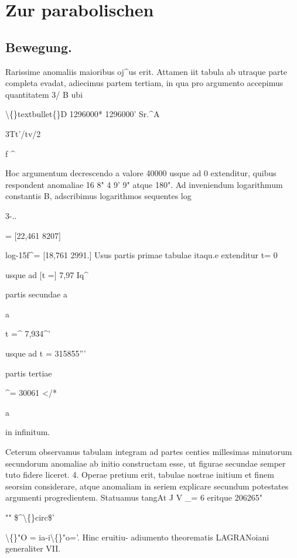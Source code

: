 \documentclass[10pt,a4paper]{article}
\begin{document}
\newpage
\section*{Zur parabolischen}

\subsection*{Bewegung.}


Rarissime anomaliis maioribus oj\textasciicircum{}us erit. Attamen iit tabula ab utraque
parte completa evadat, adiecimus partem tertiam, in qua pro argumento accepimus quantitatem
3/ B
ubi

\textbackslash\{\}textbullet\{\}D 1296000* 1296000'
Sr.\textasciicircum{}A

3Tt'/tv/2

f
\textasciicircum{}

Hoc argumentum decrescendo a valore 40000 usque ad 0 extenditur,
quibus respondent anomaliae 16 8" 4 9' 9" atque 180". Ad inveniendum logarithmum constantis B, adscribimus logarithmos sequentes
log

3-..

= [22,461 8207]

log-15f\textasciicircum{}= [18,761 2991.]
Usus partis primae tabulae itaqu.e extenditur
t= 0

usque ad [t =] 7,97 Iq\textasciicircum{}

partis secundae a

a

t =\textasciicircum{} 7,934\textasciicircum{}'

usque ad t = 315855'''

partis tertiae

\textasciicircum{}= 30061 </*

a

in infinitum.

Ceterum observamus tabulam integram ad partes centies millesimas minutorum secundorum anomaliae ab initio constructam esse, ut figurae secundae
semper tuto fidere liceret.
4.
Operae pretium erit, tabulae nostrae initium et finem seorsim considerare, atque anomaliam in seriem explicare secundum potestates argumenti progredientem.
Statuamus
tangAt J V \_= 6
eritque
206265"

"" \$\textasciicircum{}\textbackslash\{\}circ\$'

\textbackslash\{\}"O = ia-i\textbackslash\{\}"o='.
Hinc eruitiu- adiumento theorematis LAGRANoiani generaliter
VII.
\end{document}
